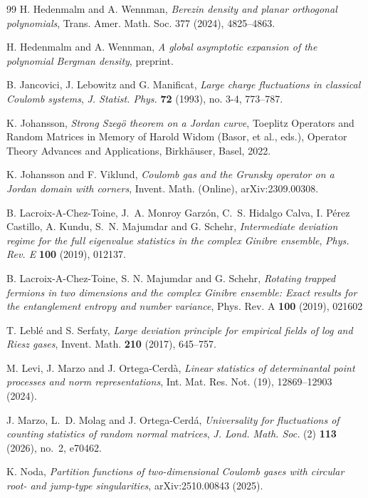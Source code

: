 \documentclass[a4paper]{article}
\numberwithin{equation}{section}
\begin{document}
\begin{thebibliography}{99}
H. Hedenmalm and A. Wennman, \emph{Berezin density and planar orthogonal polynomials}, Trans. Amer. Math. Soc. 377 (2024), 4825–4863. 


H. Hedenmalm and A. Wennman, \emph{A global asymptotic expansion of the polynomial Bergman density}, preprint.

 B. Jancovici, J. Lebowitz and G. Manificat, \emph{Large charge fluctuations in classical Coulomb systems}, \textit{J. Statist. Phys.} \textbf{72} (1993), no. 3-4, 773--787.

K. Johansson, \emph{Strong Szeg\"{o} theorem on a Jordan curve}, Toeplitz Operators and Random Matrices in Memory of Harold Widom (Basor, et al., eds.), Operator Theory Advances and Applications, Birkh\"{a}user, Basel, 2022. 


K. Johansson and F. Viklund, \emph{Coulomb gas and the Grunsky operator on a Jordan domain with corners}, Invent. Math. (Online), arXiv:2309.00308.

B. Lacroix-A-Chez-Toine, J.~A. Monroy Garz\'{o}n, C.~S. Hidalgo Calva, I. P\'{e}rez Castillo, A. Kundu, S.~N. Majumdar and G. Schehr,
\emph{Intermediate deviation regime for the full eigenvalue statistics in the complex Ginibre ensemble},
\textit{Phys. Rev. E} \textbf{100} (2019), 012137.

B. Lacroix-A-Chez-Toine, S. N. Majumdar and G. Schehr, \emph{Rotating trapped fermions in two dimensions and the complex Ginibre ensemble: Exact results for the entanglement entropy and number variance}, Phys. Rev. A {\bf 100} (2019), 021602

T. Lebl\'{e} and S. Serfaty, \emph{Large deviation principle for empirical fields of log and Riesz gases}, Invent. Math. \textbf{210} (2017), 645--757.

M. Levi, J. Marzo and J. Ortega-Cerd\`{a}, \emph{Linear statistics of determinantal point processes and norm representations}, Int. Mat. Res. Not. (19), 12869--12903 (2024).

J. Marzo, L.~D. Molag and J. Ortega-Cerd\'{a},
\emph{Universality for fluctuations of counting statistics of random normal matrices},
\textit{J. Lond. Math. Soc.} (2) \textbf{113} (2026), no.~2, e70462.

K. Noda,
\emph{Partition functions of two-dimensional Coulomb gases with circular root- and jump-type singularities},
arXiv:2510.00843 (2025).


\end{thebibliography}
\end{document}
